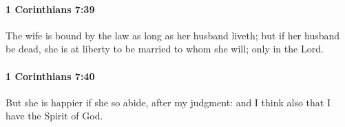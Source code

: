 		\paragraph{1 Corinthians 7:39} %
			\label{1CORINTHIANS-7-39}

			The wife is bound by the law as long as her husband liveth; but if her husband be dead, she is at liberty to be married to whom she will; only in the Lord.

			\begin{framed}
			\scriptsize
				\begin{compactdesc}
					\item[SBLG] 
				\end{compactdesc}
			\end{framed}

		\paragraph{1 Corinthians 7:40} %
			\label{1CORINTHIANS-7-40}

			But she is happier if she so abide, after my judgment: and I think also that I have the Spirit of God.

